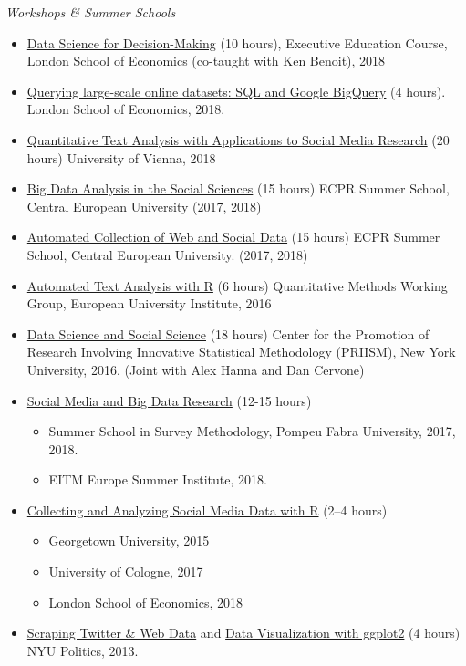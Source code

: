 \documentclass[margin,line,11pt]{resume}
\begin{document}
\begin{resume}
\emph{Workshops \& Summer Schools}
\begin{itemize}
\item \href{https://www.lse.ac.uk/study-at-lse/executive-education/courses/secure/business-and-management/data-science-for-decision-making}{Data Science for Decision-Making} (10 hours), Executive Education Course, London School of Economics (co-taught with Ken Benoit), 2018
\item \href{http://pablobarbera.com/SQL-workshop/}{Querying large-scale online datasets: SQL and Google BigQuery} (4 hours). London School of Economics, 2018.
\item \href{http://pablobarbera.com/text-analysis-vienna/}{Quantitative Text Analysis with Applications to Social Media Research} (20 hours) University of Vienna, 2018
\item \href{https://ecpr.eu/Events/PanelDetails.aspx?PanelID=7061&EventID=116}{Big Data Analysis in the Social Sciences} (15 hours) ECPR Summer School, Central European University (2017, 2018)
\item \href{https://ecpr.eu/Events/PanelDetails.aspx?PanelID=7055&EventID=116}{Automated Collection of Web and Social Data} (15 hours) ECPR Summer School, Central European University. (2017, 2018)
\item \href{https://github.com/pablobarbera/eui-text-workshop}{Automated Text Analysis with R} (6 hours) Quantitative Methods Working Group, European University Institute, 2016
\item \href{https://github.com/pablobarbera/data-science-workshop}{Data Science and Social Science} (18 hours) Center for the Promotion of Research Involving Innovative Statistical Methodology (PRIISM), New York University, 2016. (Joint with Alex Hanna and Dan Cervone)
\item \href{http://pablobarbera.com/eitm}{Social Media and Big Data Research} (12-15 hours)
\begin{itemize}
\vspace{-.1cm}
\item Summer School in Survey Methodology, Pompeu Fabra University, 2017, 2018.
\vspace{-.1cm}
\item EITM Europe Summer Institute, 2018.
\end{itemize}
\item \href{http://pablobarbera.com/social-media-workshop/}{Collecting and Analyzing Social Media Data with R} (2--4 hours)
\begin{itemize}
\vspace{-.1cm}
\item Georgetown University, 2015
\vspace{-.1cm}
\item University of Cologne, 2017
\vspace{-.1cm}
\item London School of Economics, 2018
\end{itemize}
\item \href{https://github.com/pablobarbera/workshop}{Scraping Twitter \& Web Data} and \href{https://github.com/pablobarbera/Rdataviz}{Data Visualization with ggplot2} (4 hours) NYU Politics, 2013.
\end{itemize}


\end{resume}
\end{document}

